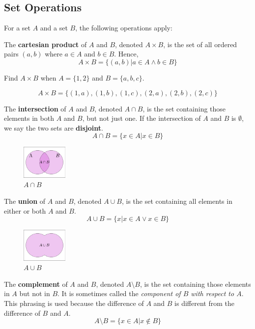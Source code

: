 \subsection{Set Operations}

For a set $A$ and a set $B$, the following operations apply:

The \textbf{cartesian product} of $A$ and $B$, denoted $A \times B$, is the set of
all ordered pairs $(a, b)$ where $a \in A$ and $b \in B$. Hence,
\[ A \times B = \big\{ (a,b) | a \in A \land b \in B \big\} \]

\begin{ex}
  Find $A \times B$ when $A = \{ 1,2 \} $ and $B = \{ a, b, c\} $.
  \begin{sol}
    \[A \times B = \big\{(1,a),(1,b),(1,c),
    (2,a),(2,b),(2,c)\big\}\]
  \end{sol}
\end{ex}

The \textbf{intersection} of $A$ and $B$, denoted 
$A \cap B$,
is the set containing those elements in both $A$ and $B$, but not just one.
If the intersection of $A$ and $B$ is $\emptyset$, we say the two sets are 
\textbf{disjoint}.
\[ A \cap B = \big\{ x \in A | x \in B \big\}\]
\begin{figure}[H]
  \begin{center}
    \includegraphics[width=0.2\textwidth]{discrete/sets/intersection.eps}
  \end{center}
  \caption{$A\cap B$}
\end{figure}The \textbf{union} of $A$ and $B$, denoted $A \cup B$,
is the set containing all elements in either or both $A$ and $B$.
\[ A \cup B = \big\{ x | x \in A \lor x \in B \big\}\]
\begin{figure}[H]
  \begin{center}
    \includegraphics[width=0.2\textwidth]{discrete/sets/union.eps}
  \end{center}
  \caption{$A \cup B$}
\end{figure}
The \textbf{complement} of $A$ and $B$, denoted $A \setminus B$,
is the set containing those elements in $A$ but not in $B$.
It is sometimes called the \emph{component of $B$ with respect to $A$}.
This phrasing is used because the difference of $A$ and $B$ is different from the difference of $B$ and $A$.
\[ A \setminus B = \big\{ x \in A \big| x \not\in B \big\} \]

